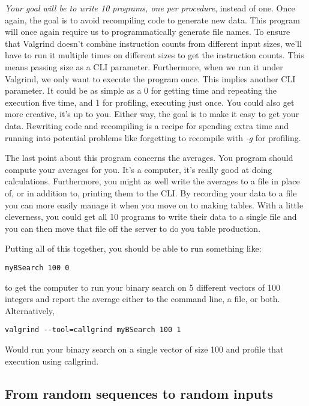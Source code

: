 \documentclass[]{tufte-handout}
\begin{document}
\textit{Your goal will be to write 10 programs, one per procedure}, instead of one.  Once again, the goal is to avoid recompiling code to generate new data. This program will once again require us to programmatically generate file names. To ensure that Valgrind doesn't combine instruction counts from different input sizes, we'll have to run it multiple times on different sizes to get the instruction counts. This means passing size as a CLI parameter. Furthermore, when we run it under Valgrind, we only want to execute the program once. This implies another CLI parameter. It could be as simple as a 0 for getting time and repeating the execution five time, and 1 for profiling, executing just once. You could also get more creative, it's up to you. Either way, the goal is to make it easy to get your data. Rewriting code and recompiling is a recipe for spending extra time and running into potential problems like forgetting to recompile with \textit{-g} for profiling.

The last point about this program concerns the averages. You program should compute your averages for you. It's a computer, it's really good at doing calculations. Furthermore, you might as well write the averages to a file in place of, or in addition to, printing them to the CLI. By recording your data to a file you can more easily manage it when you move on to making tables. With a little cleverness, you could get all 10 programs to write their data to a single file and you can then move that file off the server to do you table production.

Putting all of this together, you should be able to run something like:
\begin{verbatim}
myBSearch 100 0
\end{verbatim}
to get the computer to run your binary search on 5 different vectors of 100 integers and report the average either to the command line, a file, or both. Alternatively, 
\begin{verbatim}
valgrind --tool=callgrind myBSearch 100 1
\end{verbatim}
Would run your binary search on a single vector of size 100 and profile that execution using callgrind.

\subsection{From random sequences to random inputs}
\end{document}
